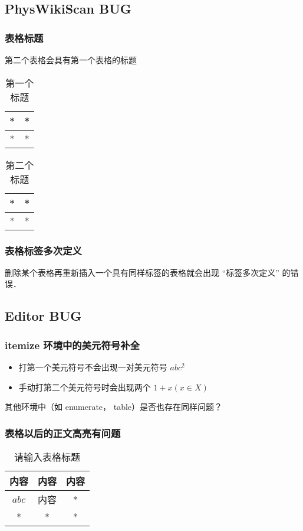 
\subsection{PhysWikiScan BUG}

\subsubsection{表格标题}
第二个表格会具有第一个表格的标题
\begin{table}[ht]
\centering
\caption{第一个标题}\label{edTODO_tab2}
\begin{tabular}{|c|c|}
\hline
* & * \\
\hline
* & * \\
\hline
\end{tabular}
\end{table}

\begin{table}[ht]
\centering
\caption{第二个标题}\label{edTODO_tab3}
\begin{tabular}{|c|c|}
\hline
* & * \\
\hline
* & * \\
\hline
\end{tabular}
\end{table}

\subsubsection{表格标签多次定义}
删除某个表格再重新插入一个具有同样标签的表格就会出现 “标签多次定义” 的错误．

\subsection{Editor BUG}
\subsubsection{itemize 环境中的美元符号补全}
\begin{itemize}
\item 打第一个美元符号不会出现一对美元符号 $abc^2$
\item 手动打第二个美元符号时会出现两个 $1 + x (x \in X)$
\end{itemize}
其他环境中（如 enumerate， table）是否也存在同样问题？

\subsubsection{表格以后的正文高亮有问题}
\begin{table}[ht]
\centering
\caption{请输入表格标题}\label{edTODO_tab1}
\begin{tabular}{|c|c|c|}
\hline
内容 & 内容 & 内容 \\
\hline
$abc$ & 内容 & * \\
\hline
* & * & * \\
\hline
\end{tabular}
\end{table}

